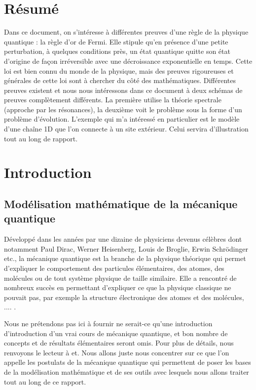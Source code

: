\documentclass[12pt,openany,a4paper, titlepage]{article}
\theoremstyle{definition}
\theoremstyle{definition}
\theoremstyle{definition}
\theoremstyle{definition}
\theoremstyle{definition}
\theoremstyle{definition}
\begin{document}
\newpage

\section{Résumé}

Dans ce document, on s'intéresse à différentes preuves d'une règle de la physique quantique : la règle d'or de Fermi. Elle stipule qu'en présence d'une petite perturbation, à quelques conditions près, un état quantique quitte son état d'origine de façon irréversible avec une décroissance exponentielle en temps. Cette loi est bien connu du monde de la physique, mais des preuves rigoureuses et générales de cette loi sont à chercher du côté des mathématiques. Différentes preuves existent et nous nous intéressons dans ce document à deux schémas de preuves complètement différents. La première utilise la théorie spectrale (approche par les résonances), la deuxième voit le problème sous la forme d'un problème d'évolution. L'exemple qui m'a intéressé en particulier est le modèle d'une chaîne 1D que l'on connecte à un site extérieur. Celui servira d'illustration tout au long de rapport.

\newpage

\tableofcontents

\newpage

\section{Introduction}

\subsection{Modélisation mathématique de la mécanique quantique}

Développé dans les années par une dizaine de physiciens devenus célèbres dont notamment Paul Dirac, Werner Heisenberg, Louis de Broglie, Erwin Schrödinger etc.,  la mécanique quantique est la branche de la physique théorique qui permet d'expliquer le comportement des particules élémentaires, des atomes, des molécules ou de tout système physique de taille similaire. Elle a rencontré de nombreux succès en permettant d'expliquer ce que la physique classique ne pouvait pas, par exemple la structure électronique des atomes et des molécules, .... . 

Nous ne prétendons pas ici à fournir ne serait-ce qu'une introduction d'introduction d'un vrai cours de mécanique quantique, et bon nombre de concepts et de résultats élémentaires seront omis. Pour plus de détails, nous renvoyons le lecteur à \cite{Quantum} et\cite{Levitt}. Nous allons juste nous concentrer sur ce que l'on appelle les postulats de la mécanique quantique qui permettent de poser les bases de la modélisation mathématique et de ses outils avec lesquels nous allons traiter tout au long de ce rapport.
\end{document}
